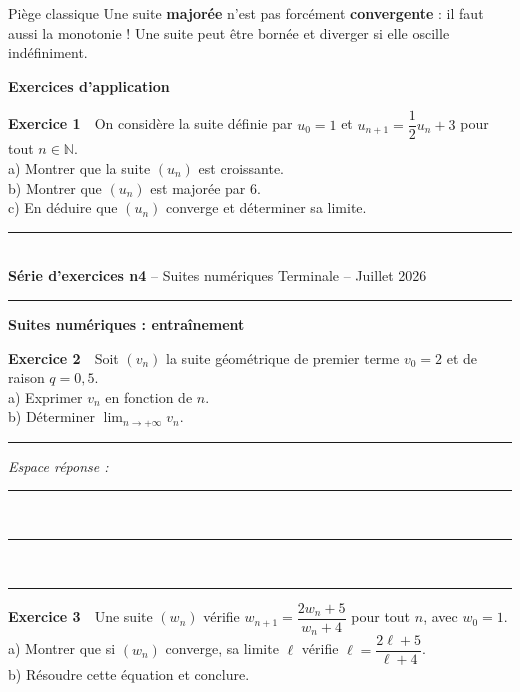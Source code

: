 \documentclass[11pt,a4paper]{article}
\newcommand{\exercice}[2]{%
  \par\vspace{8pt}%
  {\sffamily\bfseries\color{bleupetrole} Exercice #1}\quad #2\par\vspace{4pt}%
}
\newcommand{\etoiles}[1]{\textcolor{orangedoux}{\faStar[#1]}}
\newcommand{\bandeauexo}[2]{%
  {\color{bleupetrole}\rule{\linewidth}{1.2pt}}\\[4pt]
  {\sffamily\small\color{grisfonce} #1 \hfill #2}\\[2pt]
  {\color{bleupetrole}\rule{\linewidth}{1.2pt}}
  \vspace{10pt}
}
\begin{document}
\vspace{6pt}

\begin{attentionbox}{Piège classique}
Une suite \textbf{majorée} n'est pas forcément \textbf{convergente} : il faut aussi la monotonie ! Une suite peut être bornée et diverger si elle oscille indéfiniment.
\end{attentionbox}

\vspace{10pt}

{\titlefont\bfseries\color{bleupetrole} Exercices d'application}
\vspace{4pt}

\exercice{1}{\etoiles{1}\ \ On considère la suite définie par $u_0 = 1$ et $u_{n+1} = \dfrac{1}{2}u_n + 3$ pour tout $n \in \mathbb{N}$.\\
a) Montrer que la suite $(u_n)$ est croissante.\\
b) Montrer que $(u_n)$ est majorée par $6$.\\
c) En déduire que $(u_n)$ converge et déterminer sa limite.}

\clearpage

\bandeauexo{\textbf{Série d'exercices n\textdegree{}4} -- Suites numériques}{Terminale -- Juillet 2026}

{\titlefont\bfseries\Large\color{bleupetrole} Suites numériques : entraînement}

\vspace{12pt}

\exercice{2}{\etoiles{1}\etoiles{1}\ \ Soit $(v_n)$ la suite géométrique de premier terme $v_0 = 2$ et de raison $q = 0{,}5$.\\
a) Exprimer $v_n$ en fonction de $n$.\\
b) Déterminer $\displaystyle\lim_{n \to +\infty} v_n$.}

\vspace{6pt}
\noindent\textcolor{grisclair!90!black}{\rule{\linewidth}{0.4pt}}
\vspace{4pt}
\textit{\small Espace réponse :}\\[2pt]
\noindent\textcolor{grisclair!90!black}{\rule{\linewidth}{0.4pt}}\\[10pt]
\noindent\textcolor{grisclair!90!black}{\rule{\linewidth}{0.4pt}}\\[10pt]
\noindent\textcolor{grisclair!90!black}{\rule{\linewidth}{0.4pt}}

\vspace{10pt}

\exercice{3}{\etoiles{1}\etoiles{1}\etoiles{1}\ \ Une suite $(w_n)$ vérifie $w_{n+1} = \dfrac{2w_n + 5}{w_n + 4}$ pour tout $n$, avec $w_0 = 1$.\\
a) Montrer que si $(w_n)$ converge, sa limite $\ell$ vérifie $\ell = \dfrac{2\ell+5}{\ell+4}$.\\
b) Résoudre cette équation et conclure.}
\end{document}
